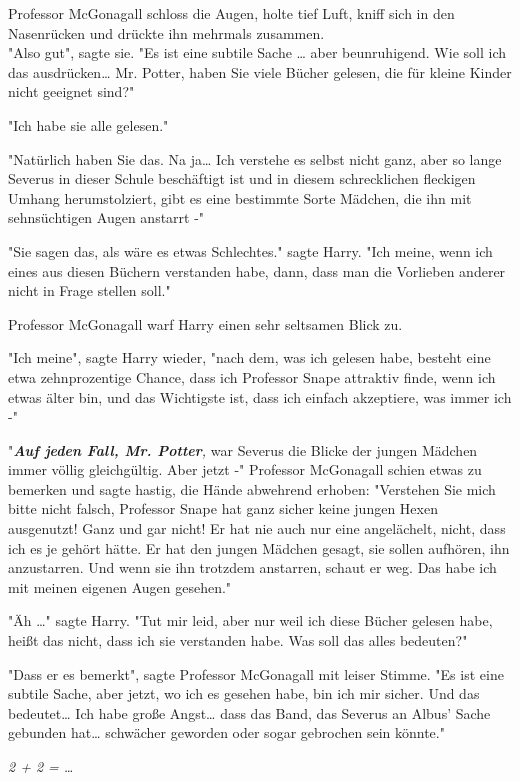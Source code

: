 {Professor McGonagall schloss die Augen, holte tief Luft, kniff sich in den Nasenrücken und drückte ihn mehrmals zusammen.\\ "Also gut", sagte sie. "Es ist eine subtile Sache … aber beunruhigend. Wie soll ich das ausdrücken… Mr. Potter, haben Sie viele Bücher gelesen, die für kleine Kinder nicht geeignet sind?"

"Ich habe sie alle gelesen."

"Natürlich haben Sie das. Na ja… Ich verstehe es selbst nicht ganz, aber so lange Severus in dieser Schule beschäftigt ist und in diesem schrecklichen fleckigen Umhang herumstolziert, gibt es eine bestimmte Sorte Mädchen, die ihn mit sehnsüchtigen Augen anstarrt -"

"Sie sagen das, als wäre es etwas Schlechtes." sagte Harry. "Ich meine, wenn ich eines aus diesen Büchern verstanden habe, dann, dass man die Vorlieben anderer nicht in Frage stellen soll."

Professor McGonagall warf Harry einen sehr seltsamen Blick zu.

"Ich meine", sagte Harry wieder, "nach dem, was ich gelesen habe, besteht eine etwa zehnprozentige Chance, dass ich Professor Snape attraktiv finde, wenn ich etwas älter bin, und das Wichtigste ist, dass ich einfach akzeptiere, was immer ich -"

"\textbf{\emph{Auf jeden Fall, Mr. Potter}}\emph{,} war Severus die Blicke der jungen Mädchen immer völlig gleichgültig. Aber jetzt -" Professor McGonagall schien etwas zu bemerken und sagte hastig, die Hände abwehrend erhoben: "Verstehen Sie mich bitte nicht falsch, Professor Snape hat ganz sicher keine jungen Hexen ausgenutzt! Ganz und gar nicht! Er hat nie auch nur eine angelächelt, nicht, dass ich es je gehört hätte. Er hat den jungen Mädchen gesagt, sie sollen aufhören, ihn anzustarren. Und wenn sie ihn trotzdem anstarren, schaut er weg. Das habe ich mit meinen eigenen Augen gesehen."

"Äh …" sagte Harry. "Tut mir leid, aber nur weil ich diese Bücher gelesen habe, heißt das nicht, dass ich sie verstanden habe. Was soll das alles bedeuten?"

"Dass er es bemerkt", sagte Professor McGonagall mit leiser Stimme. "Es ist eine subtile Sache, aber jetzt, wo ich es gesehen habe, bin ich mir sicher. Und das bedeutet… Ich habe große Angst… dass das Band, das Severus an Albus' Sache gebunden hat… schwächer geworden oder sogar gebrochen sein könnte."

\emph{2 + 2 = …}

}
